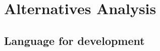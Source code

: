 \documentclass{article}
\begin{document}
%

\section{Alternatives Analysis}
    \subsection{Language for development}
\end{document}
